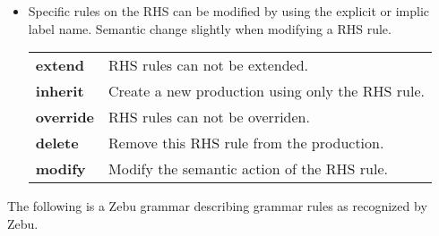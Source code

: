 \documentclass[12pt]{article}
\begin{document}
\begin{itemize}
\item Specific rules on the RHS can be modified by using the explicit or implic label name. Semantic change slightly when modifying a RHS rule.

\begin{tabular}{l l}
\textbf{extend}   & RHS rules can not be extended.                    \\
\textbf{inherit}  & Create a new production using only the RHS rule.  \\
\textbf{override} & RHS rules can not be overriden.                   \\
\textbf{delete}   & Remove this RHS rule from the production.         \\
\textbf{modify}   & Modify the semantic action of the RHS rule.       \\
\end{tabular}

\end{itemize}

The following is a Zebu grammar describing grammar rules as recognized by Zebu.
\end{document}
